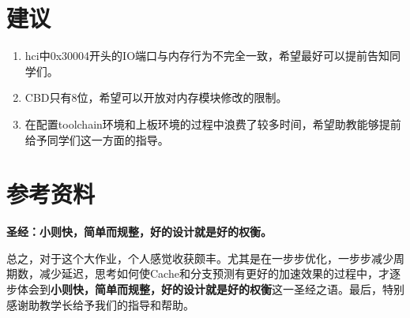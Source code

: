 \documentclass[a4paper,UTF8]{article}
\begin{document}
\section{建议}

\begin{enumerate}
\item hci中0x30004开头的IO端口与内存行为不完全一致，希望最好可以提前告知同学们。
\item CBD只有8位，希望可以开放对内存模块修改的限制。
\item 在配置toolchain环境和上板环境的过程中浪费了较多时间，希望助教能够提前给予同学们这一方面的指导。
\end{enumerate}

\section{参考资料}
\textbf{圣经：小则快，简单而规整，好的设计就是好的权衡。}

\text{}

总之，对于这个大作业，个人感觉收获颇丰。尤其是在一步步优化，一步步减少周期数，减少延迟，思考如何使Cache和分支预测有更好的加速效果的过程中，才逐步体会到\textbf{小则快，简单而规整，好的设计就是好的权衡}这一圣经之语。最后，特别感谢助教学长给予我们的指导和帮助。
\end{document}

